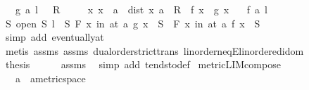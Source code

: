 \begin{isabellebody}
\ \ \ {\isachardoublequoteopen}g\ {\isasymmidarrow}a{\isasymrightarrow}\ l{\isachardoublequoteclose}\ {\isachardoublequoteopen}{}\ {\isacharless}{\kern0pt}\ R{\isachardoublequoteclose}\isanewline
\ \ \ \ \ {\isachardoublequoteopen}{\isasymAnd}x{\isachardot}{\kern0pt}\ x\ {\isasymnoteq}\ a\ {\isasymLongrightarrow}\ dist\ x\ a\ {\isacharless}{\kern0pt}\ R\ {\isasymLongrightarrow}\ f\ x\ {\isacharequal}{\kern0pt}\ g\ x{\isachardoublequoteclose}\isanewline
\ \ \ {\isachardoublequoteopen}f\ {\isasymmidarrow}a{\isasymrightarrow}\ l{\isachardoublequoteclose}\isanewline
%
\isadelimproof
%
\endisadelimproof
%
\isatagproof
{}\isamarkupfalse%
\ {\isacharminus}{\kern0pt}\isanewline
\ \ \isamarkupfalse%
\ {\isachardoublequoteopen}{\isasymAnd}S{\isachardot}{\kern0pt}\ {\isasymlbrakk}open\ S{\isacharsemicolon}{\kern0pt}\ l\ {\isasymin}\ S{\isacharsemicolon}{\kern0pt}\ {\isasymforall}\isactrlsub F\ x\ in\ at\ a{\isachardot}{\kern0pt}\ g\ x\ {\isasymin}\ S{\isasymrbrakk}\ {\isasymLongrightarrow}\ {\isasymforall}\isactrlsub F\ x\ in\ at\ a{\isachardot}{\kern0pt}\ f\ x\ {\isasymin}\ S{\isachardoublequoteclose}\isanewline
\ \ \ \ \isamarkupfalse%
\ {\isacharparenleft}{\kern0pt}simp\ add{\isacharcolon}{\kern0pt}\ eventually{\isacharunderscore}{\kern0pt}at{\isacharparenright}{\kern0pt}\isanewline
\ \ \ \ \isamarkupfalse%
\ {\isacharparenleft}{\kern0pt}metis\ assms{\isacharparenleft}{\kern0pt}{}{\isacharparenright}{\kern0pt}\ assms{\isacharparenleft}{\kern0pt}{}{\isacharparenright}{\kern0pt}\ dual{\isacharunderscore}{\kern0pt}order{\isachardot}{\kern0pt}strict{\isacharunderscore}{\kern0pt}trans\ linorder{\isacharunderscore}{\kern0pt}neqE{\isacharunderscore}{\kern0pt}linordered{\isacharunderscore}{\kern0pt}idom{\isacharparenright}{\kern0pt}\isanewline
\ \ \isamarkupfalse%
\ \isamarkupfalse%
\ {\isacharquery}{\kern0pt}thesis\isanewline
\ \ \ \ \isamarkupfalse%
\ assms\ \isamarkupfalse%
\ {\isacharparenleft}{\kern0pt}simp\ add{\isacharcolon}{\kern0pt}\ tendsto{\isacharunderscore}{\kern0pt}def{\isacharparenright}{\kern0pt}\isanewline
{}\isamarkupfalse%
%
\endisatagproof
{\isafoldproof}%
%
\isadelimproof
\isanewline
%
\endisadelimproof
\isanewline
{}\isamarkupfalse%
\ metric{\isacharunderscore}{\kern0pt}LIM{\isacharunderscore}{\kern0pt}compose{}{\isacharcolon}{\kern0pt}\isanewline
\ \ \ a\ {\isacharcolon}{\kern0pt}{\isacharcolon}{\kern0pt}\ {\isachardoublequoteopen}{\isacharprime}{\kern0pt}a{\isacharcolon}{\kern0pt}{\isacharcolon}{\kern0pt}metric{\isacharunderscore}{\kern0pt}space{\isachardoublequoteclose}\isanewline

\end{isabellebody}
